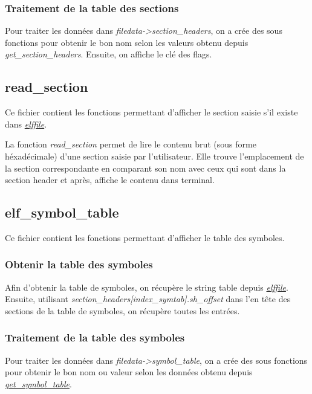 \documentclass[a4paper]{article} %
\begin{document}
\subsubsection*{Traitement de la table des sections}
Pour traiter les données dans \textit{filedata->section\_headers}, on a crée des sous 
fonctions pour obtenir le bon nom selon les valeurs obtenu depuis 
\textit{get\_section\_headers}. Ensuite, on affiche le clé des flags. 



\subsection{read\_section}
\label{sec:section}
\noindent Ce fichier contient les fonctions permettant d'afficher le section saisie s'il existe
dans \hyperref[sec:elffile]{\textit{elffile}}. 
\newline

La fonction \textit{read\_section} permet de lire le contenu brut 
(sous forme héxadécimale) d'une section saisie par l'utilisateur. Elle trouve 
l'emplacement de la section correspondante en comparant son nom avec ceux qui 
sont dans la section header et après, affiche le contenu dans terminal.



\subsection{elf\_symbol\_table}
\label{sec:symbol}
\noindent Ce fichier contient les fonctions permettant d'afficher le table des symboles.

\subsubsection*{Obtenir la table des symboles}
\label{sec:getsymtab}
Afin d'obtenir la table de symboles, on récupère le string table depuis \hyperref[sec:elffile]{\textit{elffile}}. 
Ensuite, utilisant \textit{section\_headers[index\_symtab].sh\_offset} dans 
l'en tête des sections de la table de symboles, on récupère toutes les entrées.

\subsubsection*{Traitement de la table des symboles}
Pour traiter les données dans \textit{filedata->symbol\_table}, on a crée des sous 
fonctions pour obtenir le bon nom ou valeur selon les données obtenu depuis 
\hyperref[sec:getsymtab]{\textit{get\_symbol\_table}}.
\end{document}
